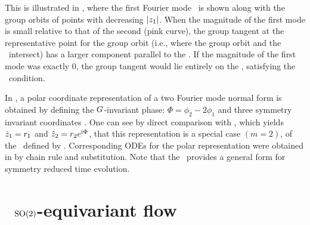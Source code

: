 \documentclass[aip,cha,
reprint,
secnumarabic,
nofootinbib, tightenlines,
nobibnotes, showkeys, showpacs,
superscriptaddress,
]{revtex4-1}
\begin{document}
This is illustrated in , where the
first Fourier mode \slicePlane\ is shown along with the group orbits of points
with decreasing $|z_1|$. When the magnitude of the first mode is small
relative to that of the second (pink curve), the group tangent at the representative point for
the group orbit (i.e., where the group orbit and the \slicePlane\ intersect) has a larger component
parallel to the \slicePlane. If the magnitude of the first mode was exactly
$0$, the group tangent would lie entirely on the \slicePlane , satisfying
the \sliceBord\ condition.

In , a polar coordinate representation of a two Fourier mode
normal form is obtained by defining the $G$-invariant phase: $\Phi = \phi_2 - 2 \phi_1$
and three symmetry invariant coordinates .
One can see by direct comparison with , which
yields $\hat{z}_1 = r_1$ and $\hat{z}_2 = r_2 e^{\mathrm{i} \Phi}$, that this
representation is a special case $(m=2)$, of the \slice\ defined by
. Corresponding ODEs for the polar representation
were obtained in  by  chain rule and substitution. Note
that the \mslices\ provides a general form  for symmetry
reduced time evolution.

\section{\twoMode\ $\textrm{SO}(2)$-equivariant flow}
\label{s:twoMode}
\end{document}
